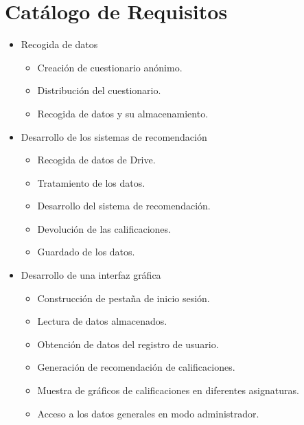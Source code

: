 \section{Catálogo de Requisitos}
\begin{itemize}
\item Recogida de datos\\ \begin{itemize}
\item Creación de cuestionario anónimo.\\ \item Distribución del cuestionario. \\ \item Recogida de datos y su almacenamiento. 
\end{itemize}

\item Desarrollo de los sistemas de recomendación\\ \begin{itemize}
\item Recogida de datos de Drive. \item Tratamiento de los datos. \item Desarrollo del sistema de recomendación. \item Devolución de las calificaciones. \item Guardado de los datos. 
\end{itemize}

\item Desarrollo de una interfaz gráfica \\ \begin{itemize}
\item Construcción de pestaña de inicio sesión.  \item Lectura de datos almacenados. \item Obtención de datos del registro de usuario. \item Generación de recomendación de calificaciones. \item Muestra de gráficos de calificaciones en diferentes asignaturas. \item Acceso a los datos generales en modo administrador. 
\end{itemize}
\end{itemize}

